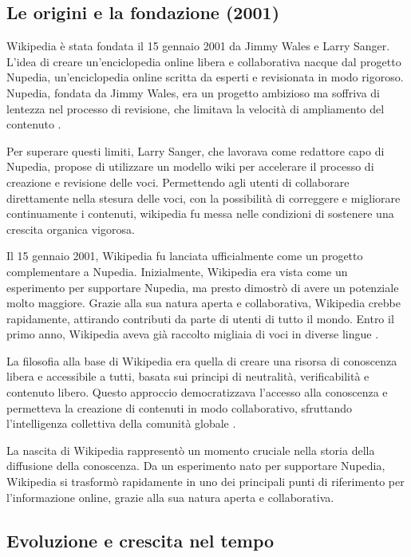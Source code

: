 \documentclass[12pt,a4paper]{report}
\begin{document}
\subsection{Le origini e la fondazione (2001)}

Wikipedia è stata fondata il 15 gennaio 2001 da Jimmy Wales e Larry Sanger. L'idea di creare un'enciclopedia online libera e collaborativa nacque dal progetto Nupedia, un'enciclopedia online scritta da esperti e revisionata in modo rigoroso. Nupedia, fondata da Jimmy Wales, era un progetto ambizioso ma soffriva di lentezza nel processo di revisione, che limitava la velocità di ampliamento del contenuto \cite{lih2009wikipedia}.

Per superare questi limiti, Larry Sanger, che lavorava come redattore capo di Nupedia, propose di utilizzare un modello wiki per accelerare il processo di creazione e revisione delle voci. Permettendo agli utenti di collaborare direttamente nella stesura delle voci, con la possibilità di correggere e migliorare continuamente i contenuti, wikipedia fu messa nelle condizioni di sostenere una crescita organica vigorosa\cite{reagle2010good}.

Il 15 gennaio 2001, Wikipedia fu lanciata ufficialmente come un progetto complementare a Nupedia. Inizialmente, Wikipedia era vista come un esperimento per supportare Nupedia, ma presto dimostrò di avere un potenziale molto maggiore. Grazie alla sua natura aperta e collaborativa, Wikipedia crebbe rapidamente, attirando contributi da parte di utenti di tutto il mondo. Entro il primo anno, Wikipedia aveva già raccolto migliaia di voci in diverse lingue \cite{jemielniak2014wikipedia}.

La filosofia alla base di Wikipedia era quella di creare una risorsa di conoscenza libera e accessibile a tutti, basata sui principi di neutralità, verificabilità e contenuto libero. Questo approccio democratizzava l'accesso alla conoscenza e permetteva la creazione di contenuti in modo collaborativo, sfruttando l'intelligenza collettiva della comunità globale \cite{denning2005wikipedia}.

La nascita di Wikipedia rappresentò un momento cruciale nella storia della diffusione della conoscenza. Da un esperimento nato per supportare Nupedia, Wikipedia si trasformò rapidamente in uno dei principali punti di riferimento per l'informazione online, grazie alla sua natura aperta e collaborativa.

\subsection{Evoluzione e crescita nel tempo}
\end{document}
